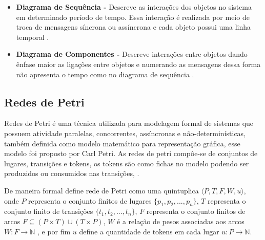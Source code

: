 \begin{itemize}
        \item \textbf{Diagrama de Sequência -} 
        Descreve as interações dos objetos no sistema em determinado período de tempo. Essa interação é realizada por meio de troca de mensagens síncrona ou assíncrona e cada objeto possui uma linha temporal \cite{uml}.
        
        \item \textbf{Diagrama de Componentes -} 
        Descreve interações entre objetos dando ênfase maior as ligações entre objetos e numerando as mensagens dessa forma não apresenta o tempo como no diagrama de sequência \cite{uml}.

    \end{itemize}

    \subsection{Redes de Petri}
        Redes de Petri é uma técnica utilizada para modelagem formal de sistemas que possuem atividade paralelas, concorrentes, assíncronas e não-determinísticas, também definida como modelo matemático para representação gráfica, esse modelo foi proposto por Carl Petri\cite{cardoso1997redes}. As redes de petri compôe-se de conjuntos de lugares, transições e tokens, os tokens são como fichas no modelo podendo ser produzidos ou consumidos nas transições,  \cite{formalVerificationUML}.
        
        \par
        De maneira formal \citeauthor{formalVerificationUML} define rede de Petri como uma quintuplica $\langle P,T,F,W,u\rangle$, onde $P$ representa o conjunto finitos de lugares $\{ p_1, p_2,..., p_n \}$, $T$ representa o conjunto finito de transições $\{t_1, t_2,..., t_n\}$, $F$ representa o conjunto finitos de arcos $F\subseteq (P \times T) \cup (T \times P)$, $W$ é a relação de pesos associadas aos arcos $W : F \rightarrow \mathbb{N}$ , e por fim $u$ define a quantidade de tokens em cada lugar $u : P \rightarrow \mathbb{N}$.
        
